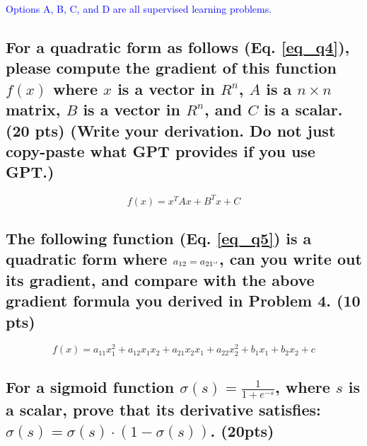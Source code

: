 \textcolor{blue}{Options A, B, C, and D are all supervised learning problems.}

\subsection{For a quadratic form as follows (Eq. \ref{eq_q4}), please compute the gradient of this function $f(x)$ where $x$ is a vector in $R^n$, $A$ is a $n \times n$ matrix, $B$ is a vector in $R^n$, and $C$ is a scalar. (20 pts) (Write your derivation. Do not just copy-paste what GPT provides if you use GPT.)}

\begin{equation}
    f(x) = x^T A x + B^T x + C
    \label{eq_q4}
\end{equation}


\subsection{The following function (Eq. \ref{eq_q5}) is a quadratic form where $a_{12}=a_{21`'}$, can you write out its gradient, and compare with the above gradient formula you derived in Problem 4. (10 pts)}

\begin{equation}
    f(x) = a_{11}x_1^2 + a_{12}x_1 x_2 + a_{21}x_2 x_1 + a_{22} x_2^2 + b_1 x_1 + b_2 x_2 + c
    \label{eq_q5}
\end{equation}

\subsection{For a sigmoid function $\sigma (s)=\frac{1}{1+e^{-s}}$, where $s$ is a scalar, prove that its derivative satisfies: $\sigma(s) = \sigma(s) \cdot (1-\sigma (s))$. (20pts)}
